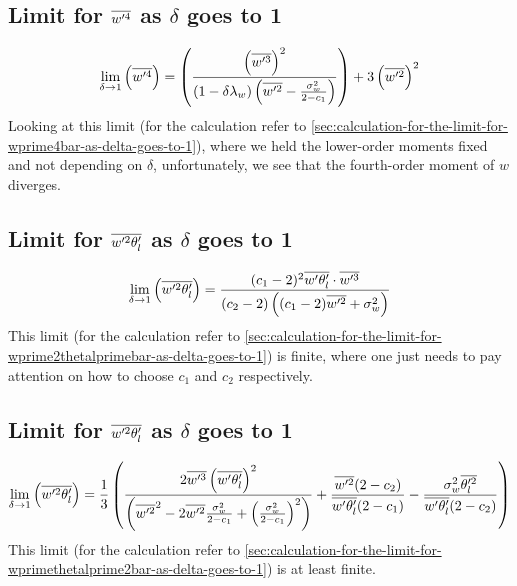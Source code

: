 \subsection{Limit for \texorpdfstring{$\overline{w'^4}$}{wprime4bar} as \texorpdfstring{$\delta$}{delta} goes to 1}
\label{subsec:limit-for-wprime4bar-as-delta-goes-to-1}

\begin{align}
    \label{eq:limit_wprime4_delta_to_1}
    \lim_{\delta \to 1}\left(\overline{w'^4}\right)
    = \left(
    \frac{
        \left(\overline{w'^3}\right)^2
    }{
        (1 - \delta\lambda_w)
        \left(\overline{w'^2} - \frac{\sigma_w^2}{2 - c_1}\right)
    }
    \right)
    + 3 \left(\overline{w'^2}\right)^2
\end{align}
Looking at this limit (for the calculation refer to \cref{sec:calculation-for-the-limit-for-wprime4bar-as-delta-goes-to-1}),
where we held the lower-order moments fixed and not depending on $\delta$,
unfortunately, we see that the fourth-order moment of $w$ diverges.

\subsection{Limit for \texorpdfstring{$\overline{w'^2 \theta_l'}$}{wprime2thetalbar} as \texorpdfstring{$\delta$}{delta} goes to 1}
\label{subsec:limit-for-wprime2thetalbar-as-delta-goes-to-1}

\begin{align}
    \label{eq:limit_wprime2thetalbar_delta_to_1}
    \lim_{\delta \to 1}\left(\overline{w'^2 \theta_l'}\right)
    = \frac{(c_1 - 2)^2 \overline{w' \theta_l'} \cdot \overline{w'^3}}{(c_2 - 2)\left((c_1 - 2)\overline{w'^2} + \sigma_w^2\right)}
\end{align}
This limit (for the calculation refer to \cref{sec:calculation-for-the-limit-for-wprime2thetalprimebar-as-delta-goes-to-1})
is finite, where one just needs to pay attention on how to choose $c_1$ and $c_2$ respectively.

\subsection{Limit for \texorpdfstring{$\overline{w'^2 \theta_l'}$}{wprimethetaltwobar} as \texorpdfstring{$\delta$}{delta} goes to 1}
\label{subsec:limit-for-wprimethetal2bar-as-delta-goes-to-1}

\begin{align}
    \label{eq:limit_wprimethetalprime2bar_delta_to_1}
    \lim_{\delta \to 1}\left(\overline{w'^2 \theta_l'}\right)
    = \frac{1}{3}
    \left(
    \frac{
        2 \overline{w'^3} \left(\overline{w' \theta_l'} \right)^2
    }
    {
        \left(\overline{w'^2}^2 - 2 \overline{w'^2} \frac{\sigma_w^2}{2 - c_1} + \left(\frac{\sigma_w^2}{2 - c_1}\right)^2 \right)
    }
    +
    \frac{\overline{w'^2}(2 - c_2)}{\overline{w' \theta_l'}(2 - c_1)}
    -
    \frac{\sigma_w^2 \overline{\theta_l'^2}}{\overline{w' \theta_l'} (2 - c_2)}
    \right)
\end{align}
This limit (for the calculation refer to \cref{sec:calculation-for-the-limit-for-wprimethetalprime2bar-as-delta-goes-to-1})
is at least finite.

